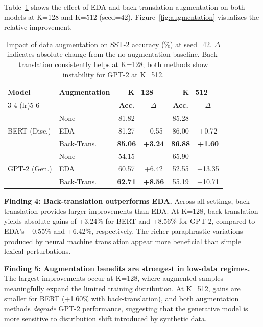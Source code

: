 \documentclass[11pt,a4paper]{article}
\begin{document}
Table~\ref{tab:augmentation} shows the effect of EDA and back-translation augmentation on both models at K=128 and K=512 (seed=42). Figure~\ref{fig:augmentation} visualizes the relative improvement.

\begin{table}[H]
\centering
\small
\begin{tabular}{llcccc}
\toprule
\multirow{2}{*}{\textbf{Model}} & \multirow{2}{*}{\textbf{Augmentation}} & \multicolumn{2}{c}{\textbf{K=128}} & \multicolumn{2}{c}{\textbf{K=512}} \\
\cmidrule(lr){3-4} \cmidrule(lr){5-6}
 & & \textbf{Acc.} & \textbf{$\Delta$} & \textbf{Acc.} & \textbf{$\Delta$} \\
\midrule
\multirow{3}{*}{BERT (Disc.)}
 & None          & 81.82 & --     & 85.28 & -- \\
 & EDA           & 81.27 & $-$0.55 & 86.00 & +0.72 \\
 & Back-Trans.   & \textbf{85.06} & \textbf{+3.24} & \textbf{86.88} & \textbf{+1.60} \\
\midrule
\multirow{3}{*}{GPT-2 (Gen.)}
 & None          & 54.15 & --     & 65.90 & -- \\
 & EDA           & 60.57 & +6.42 & 52.55 & $-$13.35 \\
 & Back-Trans.   & \textbf{62.71} & \textbf{+8.56} & 55.19 & $-$10.71 \\
\bottomrule
\end{tabular}
\caption{Impact of data augmentation on SST-2 accuracy (\%) at seed=42. $\Delta$ indicates absolute change from the no-augmentation baseline. Back-translation consistently helps at K=128; both methods show instability for GPT-2 at K=512.}
\label{tab:augmentation}
\end{table}

\textbf{Finding 4: Back-translation outperforms EDA.} Across all settings, back-translation provides larger improvements than EDA. At K=128, back-translation yields absolute gains of +3.24\% for BERT and +8.56\% for GPT-2, compared to EDA's $-$0.55\% and +6.42\%, respectively. The richer paraphrastic variations produced by neural machine translation appear more beneficial than simple lexical perturbations.

\textbf{Finding 5: Augmentation benefits are strongest in low-data regimes.} The largest improvements occur at K=128, where augmented samples meaningfully expand the limited training distribution. At K=512, gains are smaller for BERT (+1.60\% with back-translation), and both augmentation methods \textit{degrade} GPT-2 performance, suggesting that the generative model is more sensitive to distribution shift introduced by synthetic data.
\end{document}
